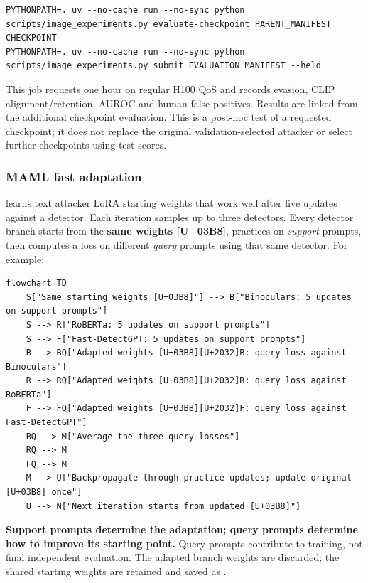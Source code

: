 \begin{Verbatim}
PYTHONPATH=. uv --no-cache run --no-sync python scripts/image_experiments.py evaluate-checkpoint PARENT_MANIFEST CHECKPOINT
PYTHONPATH=. uv --no-cache run --no-sync python scripts/image_experiments.py submit EVALUATION_MANIFEST --held
\end{Verbatim}

This job requests one hour on regular H100 QoS and records evasion, CLIP
alignment/retention, AUROC and human false positives. Results are linked
from \href{records/docs/image_final_checkpoint_test_results.tex}{the
additional checkpoint evaluation}. This is a post-hoc test of a
requested checkpoint; it does not replace the original
validation-selected attacker or select further checkpoints using test
scores.

\subsubsection{MAML fast
adaptation}\label{record-docs-research-guide-md-maml-fast-adaptation}

\texttt{} learns text attacker LoRA starting
weights that work well after five updates against a detector. Each
iteration samples up to three detectors. Every detector branch starts
from the \textbf{same weights [U+03B8]}, practices on \emph{support} prompts,
then computes a loss on different \emph{query} prompts using that same
detector. For example:

\begin{Verbatim}
flowchart TD
    S["Same starting weights [U+03B8]"] --> B["Binoculars: 5 updates on support prompts"]
    S --> R["RoBERTa: 5 updates on support prompts"]
    S --> F["Fast-DetectGPT: 5 updates on support prompts"]
    B --> BQ["Adapted weights [U+03B8][U+2032]B: query loss against Binoculars"]
    R --> RQ["Adapted weights [U+03B8][U+2032]R: query loss against RoBERTa"]
    F --> FQ["Adapted weights [U+03B8][U+2032]F: query loss against Fast-DetectGPT"]
    BQ --> M["Average the three query losses"]
    RQ --> M
    FQ --> M
    M --> U["Backpropagate through practice updates; update original [U+03B8] once"]
    U --> N["Next iteration starts from updated [U+03B8]"]
\end{Verbatim}

\textbf{Support prompts determine the adaptation; query prompts
determine how to improve its starting point.} Query prompts contribute
to training, not final independent evaluation. The adapted branch
weights are discarded; the shared starting weights are retained and
saved as \texttt{}.

